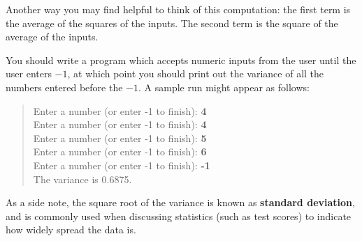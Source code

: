 \documentclass[11pt]{article}
\theoremstyle{plain}
\theoremstyle{definition}
\theoremstyle{remark}
\begin{document}
Another way you may find helpful to think of this computation: the first term is
the average of the squares of the inputs. The second term is the square of the
average of the inputs.

You should write a program which accepts numeric inputs from the user until the
user enters $-1$, at which point you should print out the variance of all the
numbers entered before the $-1$. A sample run might appear as follows:
\begin{quote}
  Enter a number (or enter -1 to finish): \textbf{4} \\
  Enter a number (or enter -1 to finish): \textbf{4} \\
  Enter a number (or enter -1 to finish): \textbf{5} \\
  Enter a number (or enter -1 to finish): \textbf{6} \\
  Enter a number (or enter -1 to finish): \textbf{-1} \\
  The variance is 0.6875.
\end{quote}
As a side note, the square root of the variance is known as \textbf{standard
deviation}, and is commonly used when discussing statistics (such as test
scores) to indicate how widely spread the data is.
\end{document}
